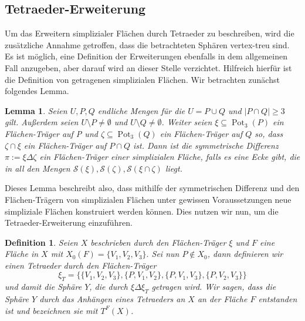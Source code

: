 \documentclass[12pt,titlepage,twoside,cleardoublepage]{article}
\theoremstyle{nummermitklammern}
\newtheorem{lemma}[temp]{Lemma}
\newtheorem{definition}[temp]{Definition}
\newtheorem{definition}[zahl]{Definition}
\newtheorem{lemma}[zahl]{Lemma}
\numberwithin{equation}{section}
\DeclareMathOperator{\Pot}{Pot}
\begin{document}
  \subsection{Tetraeder-Erweiterung}
 Um das Erweitern simplizialer Flächen durch Tetraeder zu beschreiben, wird die zusätzliche Annahme getroffen, dass die betrachteten Sphären vertex-treu sind. Es ist möglich, eine Definition der Erweiterungen ebenfalls in dem allgemeinen Fall anzugeben, aber darauf wird an dieser Stelle verzichtet.
 Hilfreich hierfür ist die Definition von getragenen simplizialen Flächen. Wir betrachten zunächst folgendes Lemma.
\begin{lemma}
Seien $U,P,Q$ endliche Mengen für die $U=P\cup Q$ und $\vert P\cap Q \vert \geq 3$ gilt. Außerdem seien $U\setminus P\neq \emptyset$ und $U\setminus Q \neq \emptyset$. Weiter seien $\xi \subseteq \Pot_3(P)$ ein Flächen-Träger auf P und $\zeta \subseteq \Pot_3(Q)$ ein Flächen-Träger auf $Q$ so, dass $\zeta \cap \xi$ ein Flächen-Träger auf $P \cap Q$ ist. Dann ist die symmetrische Differenz $\pi :=\xi \Delta \zeta$ ein Flächen-Träger einer simplizialen Fläche, falls es eine Ecke gibt, die in all den Mengen $\mathcal{S}(\xi),\mathcal{S}(\zeta),\mathcal{S}(\xi\cap\zeta)$ liegt. 
\end{lemma}
Dieses Lemma beschreibt also, dass mithilfe der symmetrischen Differenz und den Flächen-Trägern von simplizialen Flächen unter gewissen Voraussetzungen neue simpliziale Flächen konstruiert werden können. Dies nutzen wir nun, um die Tetraeder-Erweiterung einzuführen.
\begin{definition}
Seien $X$ beschrieben durch den Flächen-Träger $\xi$ und $F$ eine Fläche in $X$ mit $X_0(F)=\{V_1,V_2,V_3\}.$ Sei nun $P\notin X_0$, dann definieren wir einen Tetraeder durch den Flächen-Träger
\[
\xi_T=\{\{V_1,V_2,V_3\},\{P,V_1,V_2\},\{P,V_1,V_3\},\{P,V_2,V_3\}\}
\] 
und damit die Sphäre $Y$, die durch $\xi \Delta \xi_T$ getragen wird. Wir sagen, dass die Sphäre $Y$ durch das Anhängen eines Tetraeders an $X$ an der Fläche $F$ entstanden ist und bezeichnen sie mit $T^F(X)$.
\end{definition}
\end{document}
